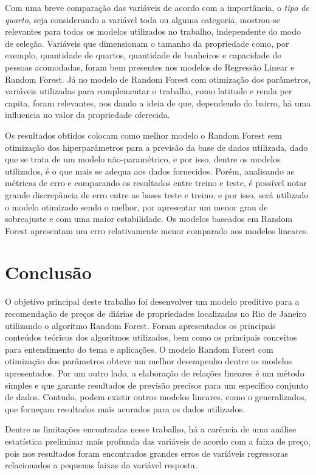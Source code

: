 \documentclass[
	12pt,				%
	a4paper,		%
	oneside,    %
	chapter=TITLE,		   %
	section=TITLE,		   %
	subsection=TITLE,	   %
	subsubsection=TITLE, %
	english,			%
	french,				%
	spanish,			%
	brazil,				%
]{abntex2}
\begin{document}
Com uma breve comparação das variáveis de acordo com a importância, o
\emph{tipo de quarto}, seja considerando a variável toda ou alguma
categoria, mostrou-se relevantes para todos os modelos utilizados no
trabalho, independente do modo de seleção. Variáveis que dimensionam o
tamanho da propriedade como, por exemplo, quantidade de quartos,
quantidade de banheiros e capacidade de pessoas acomodadas, foram bem
presentes nos modelos de Regressão Linear e Random Forest. Já no modelo
de Random Forest com otimização dos parâmetros, variáveis utilizadas
para complementar o trabalho, como latitude e renda per capita, foram
relevantes, nos dando a ideia de que, dependendo do bairro, há uma
influencia no valor da propriedade oferecida.

Os resultados obtidos colocam como melhor modelo o Random Forest sem
otimização dos hiperparâmetros para a previsão da base de dados
utilizada, dado que se trata de um modelo não-paramétrico, e por isso,
dentre os modelos utilizados, é o que mais se adequa aos dados
fornecidos. Porém, analisando as métricas de erro e comparando os
resultados entre treino e teste, é possível notar grande discrepância de
erro entre as bases teste e treino, e por isso, será utilizado o modelo
otimizado sendo o melhor, por apresentar um menor grau de sobreajuste e
com uma maior estabilidade. Os modelos baseados em Random Forest
apresentam um erro relativamente menor comparado aos modelos lineares.

\hypertarget{conclusuxe3o}{%
\chapter{Conclusão}\label{conclusuxe3o}}

O objetivo principal deste trabalho foi desenvolver um modelo preditivo
para a recomendação de preços de diárias de propriedades localizadas no
Rio de Janeiro utilizando o algoritmo Random Forest. Foram apresentados
os principais conteúdos teóricos dos algoritmos utilizados, bem como os
principais conceitos para entendimento do tema e aplicações. O modelo
Random Forest com otimização dos parâmetros obteve um melhor desempenho
dentre os modelos apresentados. Por um outro lado, a elaboração de
relações lineares é um método simples e que garante resultados de
previsão precisos para um específico conjunto de dados. Contudo, podem
existir outros modelos lineares, como o generalizados, que forneçam
resultados mais acurados para os dados utilizados.

Dentre as limitações encontradas nesse trabalho, há a carência de uma
análise estatística preliminar mais profunda das variáveis de acordo com
a faixa de preço, pois nos resultados foram encontrados grandes erros de
variáveis regressoras relacionados a pequenas faixas da variável
resposta.
\end{document}
